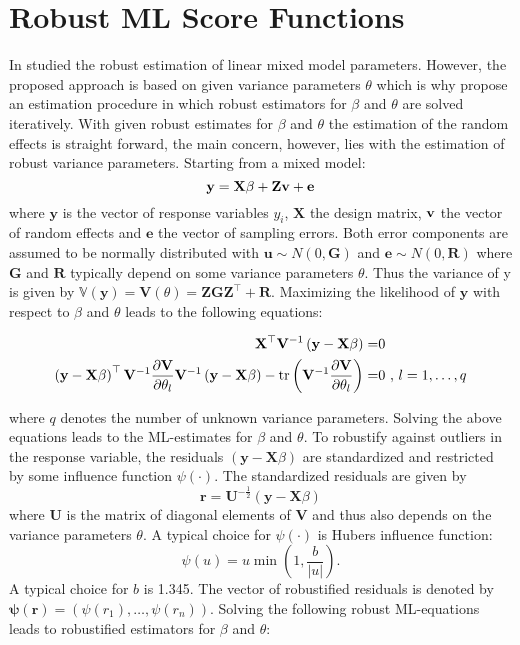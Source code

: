 \section{Robust ML Score Functions}\label{robust-ml-score-functions}

In \textcite{Fel86} studied the robust estimation of linear mixed model
parameters. However, the proposed approach is based on given variance
parameters $\theta$ which is why \textcite{Sin09} propose an estimation
procedure in which robust estimators for $\beta$ and $\theta$ are solved
iteratively. With given robust estimates for $\beta$ and $\theta$ the
estimation of the random effects is straight forward, the main concern,
however, lies with the estimation of robust variance parameters.
Starting from a mixed model: \[
\mathbf{y} = \mathbf{X} \beta + \mathbf{Z} \mathbf{v} + \mathbf{e}
\] where $\mathbf{y}$ is the vector of response variables $y_i$,
$\mathbf{X}$ the design matrix, $\mathbf{v}$ the vector of random
effects and $\mathbf{e}$ the vector of sampling errors. Both error
components are assumed to be normally distributed with
$\mathbf{u} \sim \mathit{N}(0, \mathbf{G})$ and
$\mathbf{e} \sim \mathit{N}(0, \mathbf{R})$ where $\mathbf{G}$ and
$\mathbf{R}$ typically depend on some variance parameters $\theta$. Thus
the variance of y is given by
$\mathbb{V}(\mathbf{y}) = \mathbf{V}(\theta) = \mathbf{Z}\mathbf{G}\mathbf{Z}^\top + \mathbf{R}$.
Maximizing the likelihood of $\mathbf{y}$ with respect to $\beta$ and
$\theta$ leads to the following equations:

\begin{align*}
\mathbf{X}^\top\mathbf{V}^{-1}\left(\mathbf{y}-\mathbf{X}\beta\right) =& 0 \\
\left(\mathbf{y}-\mathbf{X}\beta\right)^\top\mathbf{V}^{-1}\frac{\partial\mathbf{V}}{\partial\theta_l}\mathbf{V}^{-1}\left(\mathbf{y}-\mathbf{X}\beta\right) - \operatorname{tr}\left(\mathbf{V}^{-1}\frac{\partial\mathbf{V}}{\partial\theta_l}\right) =& 0 \text{ , } l = 1, \dots, q
\end{align*}

where $q$ denotes the number of unknown variance parameters. Solving the
above equations leads to the ML-estimates for $\beta$ and $\theta$. To
robustify against outliers in the response variable, the residuals
$\left(\mathbf{y}-\mathbf{X}\beta\right)$ are standardized and
restricted by some influence function $\psi(\cdot)$. The standardized
residuals are given by \[
\mathbf{r} = \mathbf{U}^{-\frac{1}{2}}
\left(\mathbf{y}-\mathbf{X}\beta\right)
\] where $\mathbf{U}$ is the matrix of diagonal elements of $\mathbf{V}$
and thus also depends on the variance parameters $\theta$. A typical
choice for $\psi(\cdot)$ is Hubers influence function: \[
\psi(u) = u \min\left(1, \frac{b}{|u|}\right).
\] A typical choice for $b$ is 1.345. The vector of robustified
residuals is denoted by
$\mathbf{\psi}(\mathbf{r}) = (\psi(r_1), \dots, \psi(r_{n}))$. Solving
the following robust ML-equations leads to robustified estimators for
$\beta$ and $\theta$:

